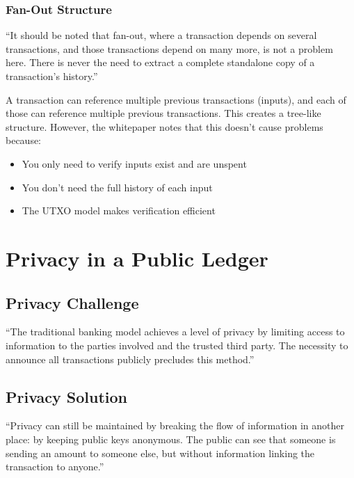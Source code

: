 \subsubsection{Fan-Out Structure}

``It should be noted that fan-out, where a transaction depends on several transactions, and those transactions depend on many more, is not a problem here. There is never the need to extract a complete standalone copy of a transaction's history.''

A transaction can reference multiple previous transactions (inputs), and each of those can reference multiple previous transactions. This creates a tree-like structure. However, the whitepaper notes that this doesn't cause problems because:

\begin{itemize}
  \item You only need to verify inputs exist and are unspent
  \item You don't need the full history of each input
  \item The UTXO model makes verification efficient
\end{itemize}


\section{Privacy in a Public Ledger}
\label{sec:privacy}

\subsection{Privacy Challenge}
\label{subsec:privacy-challenge}

``The traditional banking model achieves a level of privacy by limiting access to information to the parties involved and the trusted third party. The necessity to announce all transactions publicly precludes this method.''

\subsection{Privacy Solution}
\label{subsec:privacy-solution}

``Privacy can still be maintained by breaking the flow of information in another place: by keeping public keys anonymous. The public can see that someone is sending an amount to someone else, but without information linking the transaction to anyone.''

